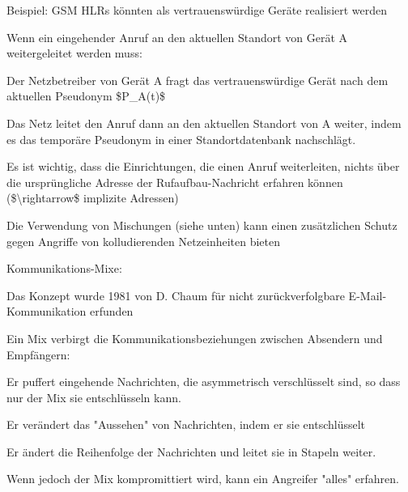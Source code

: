 \documentclass[a4paper]{article}
\begin{document}
\begin{multicols}{3}
\begin{itemize*}
\begin{itemize*}
                  \begin{itemize*}
                        \item Beispiel: GSM HLRs könnten als vertrauenswürdige Geräte realisiert werden
                  \end{itemize*}
                  \item Wenn ein eingehender Anruf an den aktuellen Standort von Gerät A weitergeleitet werden muss:
                  \begin{itemize*}
                        \item Der Netzbetreiber von Gerät A fragt das vertrauenswürdige Gerät nach dem aktuellen Pseudonym \$P\_A(t)\$
                        \item Das Netz leitet den Anruf dann an den aktuellen Standort von A weiter, indem es das temporäre Pseudonym in einer Standortdatenbank nachschlägt.
                        \item Es ist wichtig, dass die Einrichtungen, die einen Anruf weiterleiten, nichts über die ursprüngliche Adresse der Rufaufbau-Nachricht erfahren können (\$\textbackslash rightarrow\$ implizite Adressen)
                        \item Die Verwendung von Mischungen (siehe unten) kann einen zusätzlichen Schutz gegen Angriffe von kolludierenden Netzeinheiten bieten
                  \end{itemize*}
            \end{itemize*}
            \item Kommunikations-Mixe:
            \begin{itemize*}
                  \item Das Konzept wurde 1981 von D. Chaum für nicht zurückverfolgbare E-Mail-Kommunikation erfunden
                  \item Ein Mix verbirgt die Kommunikationsbeziehungen zwischen Absendern und Empfängern:
                  \begin{itemize*}
                        \item Er puffert eingehende Nachrichten, die asymmetrisch verschlüsselt sind, so dass nur der Mix sie entschlüsseln kann.
                        \item Er verändert das "Aussehen" von Nachrichten, indem er sie entschlüsselt
                        \item Er ändert die Reihenfolge der Nachrichten und leitet sie in Stapeln weiter.
                        \item Wenn jedoch der Mix kompromittiert wird, kann ein Angreifer "alles" erfahren.

\end{itemize*}
\end{itemize*}
\end{itemize*}
\end{multicols}
\end{document}
